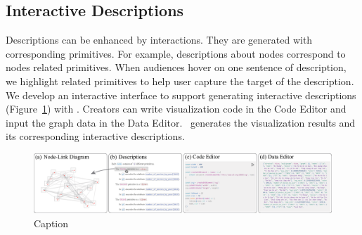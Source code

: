 \subsection{Interactive Descriptions}
Descriptions can be enhanced by interactions.
They are generated with corresponding primitives.
For example, descriptions about nodes correspond to nodes related primitives.
When audiences hover on one sentence of description, we highlight related primitives to help user capture the target of the description.
We develop an interactive interface to support generating interactive descriptions (Figure~\ref{fig:interface}) with \ApproachName.
Creators can write visualization code in the Code Editor and input the graph data in the Data Editor.
\ApproachName~generates the visualization results and its corresponding interactive descriptions.


\begin{figure}[ht]
    \centering
    \includegraphics[width=2\columnwidth]{figures/interface.eps}
    \caption{Caption}
    \label{fig:interface}
\end{figure}